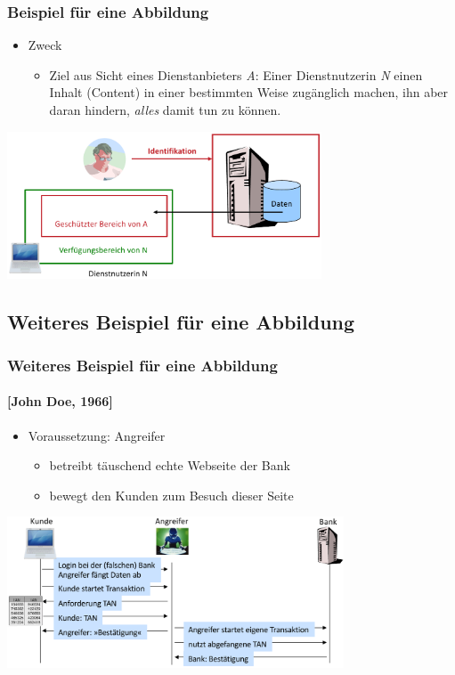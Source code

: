 \documentclass[t,aspectratio=169]{beamer}
\begin{document}
\begin{frame}
	\transwipe %
	\frametitle{Beispiel für eine Abbildung}
	\begin{itemize}
		\item Zweck
			\begin{itemize}
				\item Ziel aus Sicht eines Dienstanbieters \emph{\color{red} A}: Einer Dienstnutzerin \emph{\color[RGB]{0,128,0} N} einen Inhalt (Content) in einer bestimmten Weise zugänglich machen, ihn aber daran hindern, \emph{alles} damit tun zu können.
				
			\end{itemize}
	\end{itemize}
	\vspace{\fill}
	\begin{center}
		\includegraphics[width=0.7\textwidth]{../pic/Abb1.pdf}
	\end{center}
\end{frame}

\subsection{Weiteres Beispiel für eine Abbildung} %

\begin{frame}
	\frametitle{Weiteres Beispiel für eine Abbildung}
	\framesubtitle{[John Doe, 1966]}
	\begin{itemize}
		\item Voraussetzung: {\color{black} Angreifer} 
			\begin{itemize}
				\item betreibt täuschend echte Webseite der Bank
				\item bewegt den Kunden zum Besuch dieser Seite
			\end{itemize}
	\end{itemize}
	\vspace{\fill}
	\begin{center}
		\includegraphics[width=0.75\textwidth]{../pic/Abb2.pdf}
	\end{center}
\end{frame}
\end{document}
